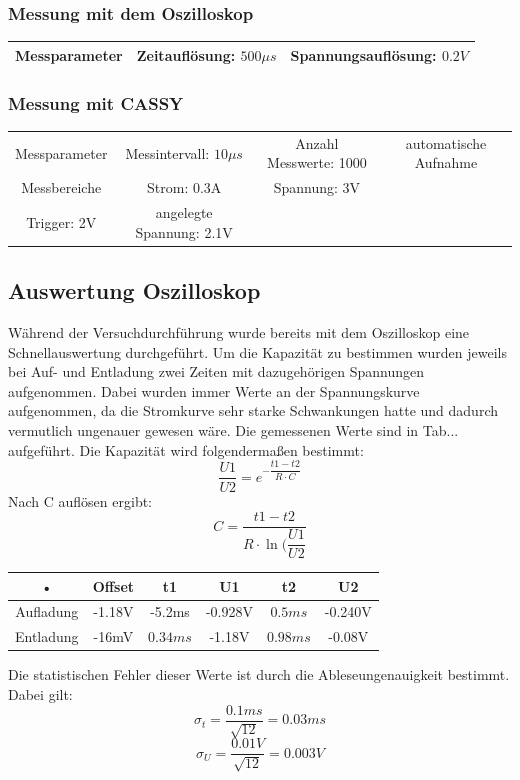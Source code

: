 \documentclass[12pt,a4paper]{article}
\begin{document}
\subsubsection{Messung mit dem Oszilloskop}
\begin{tabular}{c c c}
\hline 
Messparameter & Zeitauflösung: $500\mu s$  & Spannungsauflösung: $0.2V$ \\ 
\hline
\end{tabular} 
\subsubsection{Messung mit CASSY}
\begin{tabular}{c c c c}
Messparameter & Messintervall: $10\mu s$  & Anzahl Messwerte: 1000 & automatische Aufnahme \\ 
Messbereiche & Strom: 0.3A & Spannung: 3V \\
Trigger: 2V & angelegte Spannung: 2.1V\\
\end{tabular} 

\subsection{Auswertung Oszilloskop}
Während der Versuchdurchführung wurde bereits mit dem Oszilloskop eine Schnellauswertung durchgeführt.
Um die Kapazität zu bestimmen wurden jeweils bei Auf- und Entladung zwei Zeiten mit dazugehörigen Spannungen aufgenommen. Dabei wurden immer Werte an der Spannungskurve aufgenommen, da die Stromkurve sehr starke Schwankungen hatte und dadurch vermutlich ungenauer gewesen wäre. Die gemessenen Werte sind in Tab... aufgeführt. Die Kapazität wird folgendermaßen bestimmt:
\begin{equation}
\dfrac{U1}{U2} = e^{-\dfrac{t1-t2}{R\cdot C}}
\end{equation}
Nach C auflösen ergibt:
\begin{equation}
C = \dfrac{t1-t2}{R\cdot \ln(\dfrac{U1}{U2}}
\end{equation}


\begin{tabular}{|c|c|c|c|c|c|}
\hline 
• & Offset & t1 & U1 & t2 & U2 \\ 
\hline 
Aufladung & -1.18V & -5.2ms & -0.928V & $0.5ms$ & -0.240V \\ 
\hline 
Entladung & -16mV & $0.34ms$ & -1.18V & $0.98ms$ & -0.08V \\ 
\hline 
\end{tabular} 
Die statistischen Fehler dieser Werte ist durch die Ableseungenauigkeit bestimmt. Dabei gilt:
\begin{equation}
\sigma_t = \dfrac{0.1ms}{\sqrt{12}} = 0.03ms
\end{equation}
\begin{equation}
\sigma_U = \dfrac{0.01V}{\sqrt{12}} = 0.003V
\end{equation}
\end{document}
